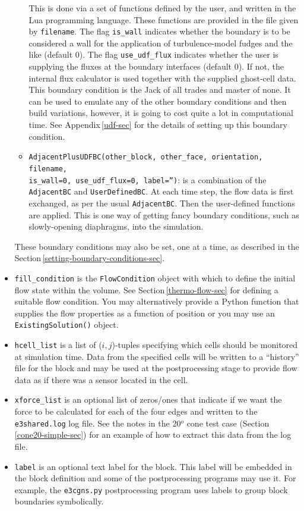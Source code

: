 \begin{itemize}
\begin{itemize}
       This is done via a set of functions defined by the user, and written in the Lua
       programming language.
       These functions are provided in the file given by \texttt{filename}.
       The flag \texttt{is\_wall} indicates whether the boundary is to be considered
       a wall for the application of turbulence-model fudges and the like (default 0).
       The flag \texttt{use\_udf\_flux} indicates whether the user is supplying
       the fluxes at the boundary interfaces (default 0).  
       If not, the internal flux calculator is used together with the supplied ghost-cell data.
       This boundary condition is the Jack of all trades and master of none.
       It can be used to emulate any of the other boundary conditions and then build
       variations, however, it is going to cost quite a lot in computational time.
       See Appendix\,\ref{udf-sec} for the details of setting up this boundary condition.
    \item \texttt{AdjacentPlusUDFBC(other\_block, other\_face, orientation, filename, \\is\_wall=0, use\_udf\_flux=0, label='')}: 
       is a combination of the \texttt{AdjacentBC} and \texttt{UserDefinedBC}.
       At each time step, the flow data is first exchanged, as per the usual
       \texttt{AdjacentBC}.  Then the user-defined functions are applied.
       This is one way of getting fancy boundary conditions, such as slowly-opening diaphragms,
       into the simulation.
  \end{itemize}
  These boundary conditions may also be set, one at a time, as described in the 
  Section\,\ref{setting-boundary-conditions-sec}.
\item \texttt{fill\_condition} is the \texttt{FlowCondition} object with which to
  define the initial flow state within the volume.
  See Section\,\ref{thermo-flow-sec} for defining a suitable flow condition.
  You may alternatively provide a Python function that supplies the flow properties as
  a function of position or you may use an \texttt{ExistingSolution()} object.
\item \texttt{hcell\_list} is a list of ($i,j$)-tuples specifying which
  cells should be monitored at simulation time.
  Data from the specified cells will be written to a ``history'' file for the
  block and may be used at the postprocessing stage to provide flow data as if
  there was a sensor located in the cell.
\item \texttt{xforce\_list} is an optional list of zeros/ones that indicate if we
  want the force to be calculated for each of the four edges and written to the 
  \texttt{e3shared.log} log file.
  See the notes in the 20$^o$ cone test case (Section\,\ref{cone20-simple-sec}) for an
  example of how to extract this data from the log file. 
\item \texttt{label} is an optional text label for the block.  This label
  will be embedded in the block definition and some of the postprocessing
  programs may use it.
  For example, the \texttt{e3cgns.py} postprocessing program uses labels to group block boundaries symbolically.
\end{itemize}
